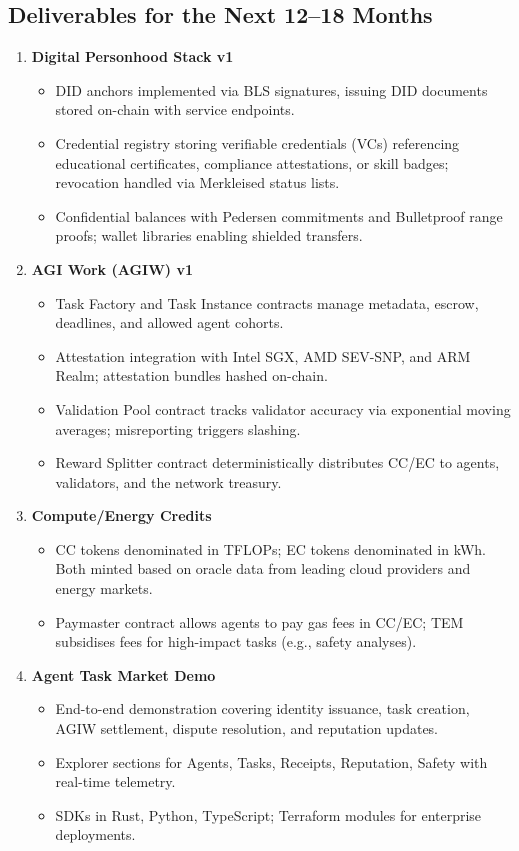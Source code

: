 \documentclass[11pt]{article}
\begin{document}
\subsection{Deliverables for the Next 12--18 Months}
\begin{enumerate}[label=\textbf{D\arabic*.}, leftmargin=*]
  \item \textbf{Digital Personhood Stack v1}
  \begin{itemize}[noitemsep]
    \item DID anchors implemented via BLS signatures, issuing DID documents stored on-chain with service endpoints.
    \item Credential registry storing verifiable credentials (VCs) referencing educational certificates, compliance attestations, or skill badges; revocation handled via Merkleised status lists.
    \item Confidential balances with Pedersen commitments and Bulletproof range proofs; wallet libraries enabling shielded transfers.
  \end{itemize}
  \item \textbf{AGI Work (AGIW) v1}
  \begin{itemize}[noitemsep]
    \item Task Factory and Task Instance contracts manage metadata, escrow, deadlines, and allowed agent cohorts.
    \item Attestation integration with Intel SGX, AMD SEV-SNP, and ARM Realm; attestation bundles hashed on-chain.
    \item Validation Pool contract tracks validator accuracy via exponential moving averages; misreporting triggers slashing.
    \item Reward Splitter contract deterministically distributes CC/EC to agents, validators, and the network treasury.
  \end{itemize}
  \item \textbf{Compute/Energy Credits}
  \begin{itemize}[noitemsep]
    \item CC tokens denominated in TFLOPs; EC tokens denominated in kWh. Both minted based on oracle data from leading cloud providers and energy markets.
    \item Paymaster contract allows agents to pay gas fees in CC/EC; TEM subsidises fees for high-impact tasks (e.g., safety analyses).
  \end{itemize}
  \item \textbf{Agent Task Market Demo}
  \begin{itemize}[noitemsep]
    \item End-to-end demonstration covering identity issuance, task creation, AGIW settlement, dispute resolution, and reputation updates.
    \item Explorer sections for Agents, Tasks, Receipts, Reputation, Safety with real-time telemetry.
    \item SDKs in Rust, Python, TypeScript; Terraform modules for enterprise deployments.
  \end{itemize}
\end{enumerate}
\end{document}
